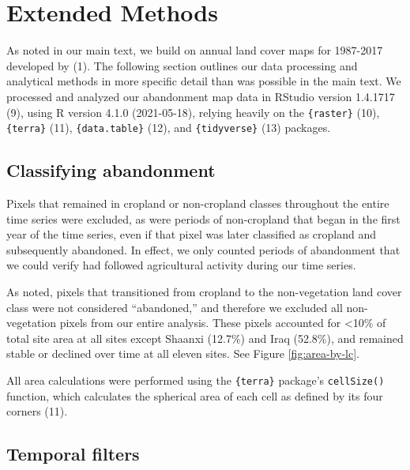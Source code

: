\documentclass[9pt,twoside,lineno]{pnas-new}
\begin{document}
\newpage

\hypertarget{methods-si}{%
\section{Extended Methods}\label{methods-si}}

As noted in our main text, we build on annual land cover maps for 1987-2017 developed by (1).
The following section outlines our data processing and analytical methods in more specific detail than was possible in the main text.
We processed and analyzed our abandonment map data in RStudio version 1.4.1717 (9), using R version 4.1.0 (2021-05-18), relying heavily on the \texttt{\{raster\}} (10), \texttt{\{terra\}} (11), \texttt{\{data.table\}} (12), and \texttt{\{tidyverse\}} (13) packages.

\hypertarget{classifying-abandonment}{%
\subsection{Classifying abandonment}\label{classifying-abandonment}}

Pixels that remained in cropland or non-cropland classes throughout the entire time series were excluded, as were periods of non-cropland that began in the first year of the time series, even if that pixel was later classified as cropland and subsequently abandoned.
In effect, we only counted periods of abandonment that we could verify had followed agricultural activity during our time series.

As noted, pixels that transitioned from cropland to the non-vegetation land cover class were not considered ``abandoned,'' and therefore we excluded all non-vegetation pixels from our entire analysis.
These pixels accounted for \textless10\% of total site area at all sites except Shaanxi (12.7\%) and Iraq (52.8\%), and remained stable or declined over time at all eleven sites.
See Figure \ref{fig:area-by-lc}.

All area calculations were performed using the \texttt{\{terra\}} package's \texttt{cellSize()} function, which calculates the spherical area of each cell as defined by its four corners (11).

\hypertarget{temporal-filters}{%
\subsection{Temporal filters}\label{temporal-filters}}
\end{document}
